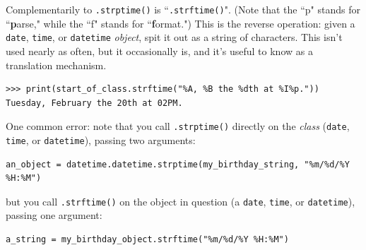 \documentclass[12pt]{article}
\begin{document}
Complementarily to \texttt{.strptime()} is ``\texttt{.strftime()}". (Note that
the ``p" stands for ``\textbf{p}arse," while
the ``f" stands for ``\textbf{f}ormat.") This is the reverse operation: given
a \texttt{date}, \texttt{time}, or \texttt{datetime} \textit{object}, spit it
out as a string of characters. This isn't used nearly as often, but it
occasionally is, and it's useful to know as a translation mechanism.

\begin{Verbatim}[fontsize=small,samepage=true,frame=none]
>>> print(start_of_class.strftime("%A, %B the %dth at %I%p."))
Tuesday, February the 20th at 02PM.
\end{Verbatim}

One common error: note that you call \texttt{.strptime()} directly on the
\textit{class} (\texttt{date}, \texttt{time}, or \texttt{datetime}), passing
two arguments:

\begin{Verbatim}[fontsize=small,samepage=true,frame=none]
an_object = datetime.datetime.strptime(my_birthday_string, "%m/%d/%Y %H:%M")
\end{Verbatim}

but you call \texttt{.strftime()} on the object in question
(a \texttt{date}, \texttt{time}, or \texttt{datetime}), passing
one argument:

\begin{Verbatim}[fontsize=small,samepage=true,frame=none]
a_string = my_birthday_object.strftime("%m/%d/%Y %H:%M")
\end{Verbatim}
\end{document}
